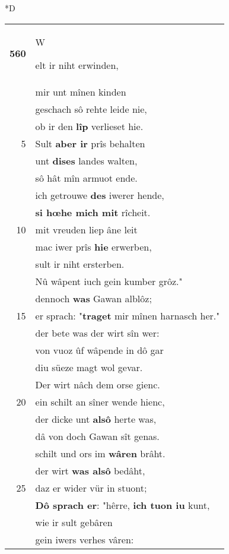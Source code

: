 \documentclass[8pt,a4paper,notitlepage]{article}
\begin{document}
\begin{table}[ht]
\begin{minipage}[t]{0.5\linewidth}
\small
\begin{center}*D
\end{center}
\begin{tabular}{rl}
\textbf{560} & \begin{large}W\end{large}elt ir niht erwinden,\\ 
 & mir unt mînen kinden\\ 
 & geschach sô rehte leide nie,\\ 
 & ob ir den \textbf{lîp} verlieset hie.\\ 
5 & Sult \textbf{aber ir} prîs behalten\\ 
 & unt \textbf{dises} landes walten,\\ 
 & sô hât mîn armuot ende.\\ 
 & ich getrouwe \textbf{des} iwerer hende,\\ 
 & \textbf{si hœhe mich mit} rîcheit.\\ 
10 & mit vreuden liep âne leit\\ 
 & mac iwer prîs \textbf{hie} erwerben,\\ 
 & sult ir niht ersterben.\\ 
 & Nû wâpent iuch gein kumber grôz."\\ 
 & dennoch \textbf{was} Gawan alblôz;\\ 
15 & er sprach: "\textbf{traget} mir mînen harnasch her."\\ 
 & der bete was der wirt sîn wer:\\ 
 & von vuoz ûf wâpende in dô gar\\ 
 & diu süeze magt wol gevar.\\ 
 & Der wirt nâch dem orse gienc.\\ 
20 & ein schilt an sîner wende hienc,\\ 
 & der dicke unt \textbf{alsô} herte was,\\ 
 & dâ von doch Gawan sît genas.\\ 
 & schilt und ors im \textbf{wâren} brâht.\\ 
 & der wirt \textbf{was alsô} bedâht,\\ 
25 & daz er wider vür in stuont;\\ 
 & \textbf{Dô sprach er}: "hêrre, \textbf{ich tuon iu} kunt,\\ 
 & wie ir sult gebâren\\ 
 & gein iwers verhes vâren:\\ 

\end{tabular}
\end{minipage}
\end{table}
\end{document}
